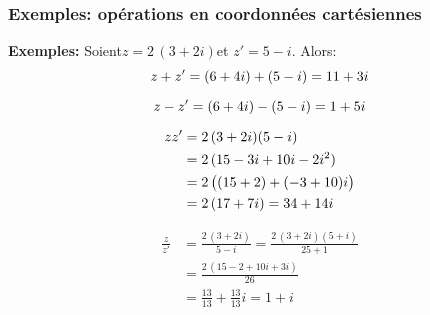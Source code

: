 
\begin{frame}
\frametitle{\bf Exemples: op\'erations en coordonnées cartésiennes}
\medskip 

{\bf Exemples:} 
Soient\quad $z=2\,(3+2i)$\quad et \quad $z'=5-i$. Alors:
$$
z+z' = (6+4i) + (5-i) = 11+3i 
\vspace*{-2mm}
$$

\pause
$$
z-z' = (6+4i) - (5-i) = 1+5i  
\vspace*{-2mm}
$$

\pause
\begin{align*}
zz' & = 2\,(3+2i)(5-i) \\ 
& = 2\,(15-3i+10i-2i^2) \\ 
& = 2\,\big((15+2) + (-3+10)i\big) \\ 
& = 2\,(17+7i) = 34+14i 
\vspace*{-2mm}
\end{align*}

\pause
\begin{align*}
\frac{z}{z'} & = \frac{2\,(3+2i)}{5-i} 
=  \frac{2\,(3+2i)(5+i)}{25+1} \\ 
& = \frac{2\,(15-2 + 10i+3i)}{26} \\ 
& = \frac{13}{13} + \frac{13}{13}i 
= 1 + i
\end{align*}

\end{frame}



%
%
%
%



